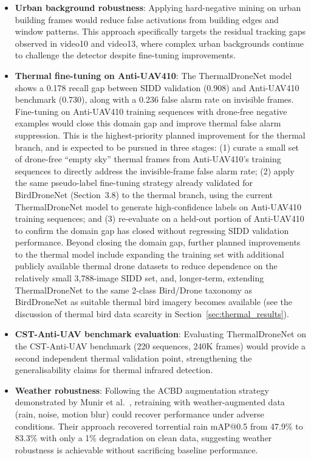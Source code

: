 \documentclass[12pt,a4paper]{report}
\begin{document}
\begin{itemize}
  \item \textbf{Urban background robustness}: Applying hard-negative mining on urban building frames would reduce false activations from building edges and window patterns. This approach specifically targets the residual tracking gaps observed in video10 and video13, where complex urban backgrounds continue to challenge the detector despite fine-tuning improvements.
  
  \item \textbf{Thermal fine-tuning on Anti-UAV410}: The ThermalDroneNet model shows a 0.178 recall gap between SIDD validation (0.908) and Anti-UAV410 benchmark (0.730), along with a 0.236 false alarm rate on invisible frames. Fine-tuning on Anti-UAV410 training sequences with drone-free negative examples would close this domain gap and improve thermal false alarm suppression. This is the highest-priority planned improvement for the thermal branch, and is expected to be pursued in three stages: (1) curate a small set of drone-free ``empty sky'' thermal frames from Anti-UAV410's training sequences to directly address the invisible-frame false alarm rate; (2) apply the same pseudo-label fine-tuning strategy already validated for BirdDroneNet (Section~3.8) to the thermal branch, using the current ThermalDroneNet model to generate high-confidence labels on Anti-UAV410 training sequences; and (3) re-evaluate on a held-out portion of Anti-UAV410 to confirm the domain gap has closed without regressing SIDD validation performance. Beyond closing the domain gap, further planned improvements to the thermal model include expanding the training set with additional publicly available thermal drone datasets to reduce dependence on the relatively small 3,788-image SIDD set, and, longer-term, extending ThermalDroneNet to the same 2-class Bird/Drone taxonomy as BirdDroneNet as suitable thermal bird imagery becomes available (see the discussion of thermal bird data scarcity in Section~\ref{sec:thermal_results}).
  
  \item \textbf{CST-Anti-UAV benchmark evaluation}: Evaluating ThermalDroneNet on the CST-Anti-UAV benchmark (220 sequences, 240K frames) would provide a second independent thermal validation point, strengthening the generalisability claims for thermal infrared detection.
  
  \item \textbf{Weather robustness}: Following the ACBD augmentation strategy demonstrated by Munir et al.~\cite{munir2023kfupm}, retraining with weather-augmented data (rain, noise, motion blur) could recover performance under adverse conditions. Their approach recovered torrential rain mAP@0.5 from 47.9\% to 83.3\% with only a 1\% degradation on clean data, suggesting weather robustness is achievable without sacrificing baseline performance.
  

\end{itemize}
\end{document}
